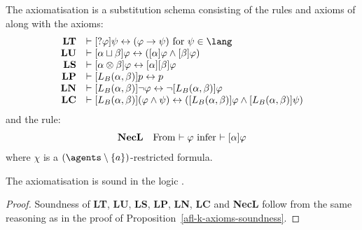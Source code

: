\begin{definition}\label{afl-s-axioms}
The axiomatisation \axiomAflS{} is a substitution schema consisting of the rules and axioms of \axiomS{} along with the axioms:
$$
\begin{array}{rl}
    {\bf LT} & \proves \actionA{\test{\phi}} \psi \iff (\phi \implies \psi) \text{ for } \psi \in \lang\\
    {\bf LU} & \proves \actionA{\alpha \choice \beta} \phi \iff (\actionA{\alpha} \phi \land \actionA{\beta} \phi)\\
    {\bf LS} & \proves \actionA{\alpha \compose \beta} \phi \iff \actionA{\alpha} \actionA{\beta} \phi\\
    {\bf LP} & \proves \actionA{\learnsBs (\alpha, \beta)} \atomP \iff \atomP\\
    {\bf LN} & \proves \actionA{\learnsBs (\alpha, \beta)} \neg \phi \iff \neg \actionA{\learnsBs (\alpha, \beta)} \phi\\
    {\bf LC} & \proves \actionA{\learnsBs (\alpha, \beta)} (\phi \land \psi) \iff (\actionA{\learnsBs (\alpha, \beta)} \phi \land \actionA{\learnsBs (\alpha, \beta)} \psi)\\
\end{array}
$$
and the rule:
$$
\begin{array}{rl}
    {\bf NecL} & \text{From $\vdash \varphi$ infer $\vdash {[ {\alpha} ]} \varphi$}
\end{array}
$$
where $\chi$ is a $(\agents \setminus \{\agentA\})$-restricted formula.
\end{definition}

\begin{proposition}\label{afl-s-axioms-soundness}
The axiomatisation \axiomAflS{} is sound in the logic \logicAmlS{}.
\end{proposition}

\begin{proof}
Soundness of {\bf LT}, {\bf LU}, {\bf LS}, {\bf LP}, {\bf LN}, {\bf LC} and {\bf NecL} follow from the same reasoning as in the proof of Proposition~\ref{afl-k-axioms-soundness}.
\end{proof}

